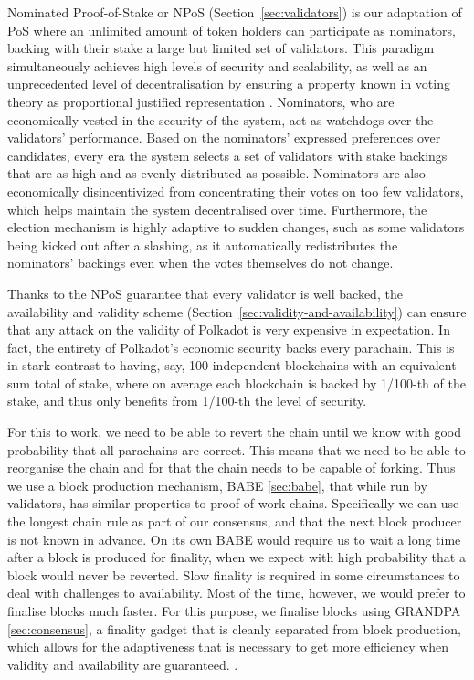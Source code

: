 Nominated Proof-of-Stake or NPoS (Section~\ref{sec:validators}) is our adaptation of PoS where an unlimited amount of token holders can participate as nominators, backing with their stake a large but limited set of validators. This paradigm simultaneously achieves high levels of security and scalability, as well as an unprecedented level of decentralisation by ensuring a property known in voting theory as proportional justified representation \cite{sanchez2017proportional, brill2017phragmen}. Nominators, who are economically vested in the security of the system, act as watchdogs over the validators' performance. Based on the nominators' expressed preferences over candidates, every era the system selects a set of validators with stake backings that are as high and as evenly distributed as possible. Nominators are also economically disincentivized from concentrating their votes on too few validators, which helps maintain the system decentralised over time. Furthermore, the election mechanism is highly adaptive to sudden changes, such as some validators being kicked out after a slashing, as it automatically redistributes the nominators' backings even when the votes themselves do not change. 

Thanks to the NPoS guarantee that every validator is well backed, the availability and validity scheme (Section~\ref{sec:validity-and-availability}) can ensure that any attack on the validity of Polkadot is very expensive in expectation. In fact, the entirety of Polkadot's economic security backs every parachain. This is in stark contrast to having, say, 100 independent blockchains with an equivalent sum total of stake, where on average each blockchain is backed by 1/100-th of the stake, and thus only benefits from 1/100-th the level of security.  

For this to work, we need to be able to revert the chain until we know with good probability that all parachains are correct. This means that we need to be able to reorganise the chain and for that the chain needs to be capable of forking. Thus we use a block production mechanism, BABE \ref{sec:babe}, that while run by validators, has similar properties to proof-of-work chains. Specifically we can use the longest chain rule as part of our consensus, and that the next block producer is not known in advance. On its own BABE would require us to wait a long time after a block is produced for finality, when we expect with high probability that a block would never be reverted. Slow finality is required in some circumstances to deal with challenges to availability. Most of the time, however, we would prefer to finalise blocks much faster.  For this purpose, we finalise blocks using GRANDPA \ref{sec:consensus}, a finality gadget that is cleanly separated from block production, which allows for the adaptiveness that is necessary to get more efficiency when validity and availability are guaranteed. . 

